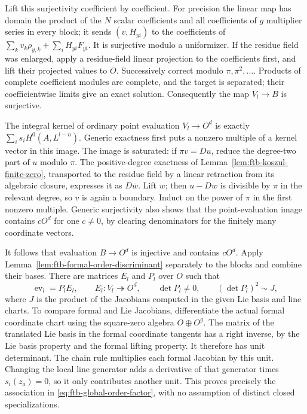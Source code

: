 Lift this surjectivity coefficient by coefficient.
For precision the linear map has domain the product of the \(N\)
scalar coefficients and all coefficients of \(g\) multiplier series
in every block; it sends \((v,H_{yi})\) to the coefficients of
\(\sum_kv_k\rho_{y,k}+\sum_iH_{yi}F_{yi}\).
It is surjective modulo a uniformizer.
If the residue field was enlarged, apply a residue-field linear
projection to the coefficients first, and lift their projected
values to \(O\).
Successively correct modulo \(\pi,\pi^2,\ldots\).
Products of complete coefficient modules are complete, and the
target is separated; their coefficientwise limits give an exact
solution.  Consequently the map \(V_l\to B\) is surjective.

The integral kernel of ordinary point evaluation \(V_l\to O^d\)
is exactly \(\sum_i s_i H^0(A,L^{l-n})\).
Generic exactness first puts a nonzero multiple of a kernel vector
in this image.  The image is saturated: if \(\pi v=Du\), reduce
the degree-two part of \(u\) modulo \(\pi\).
The positive-degree exactness of
Lemma~\ref{lem:ftb-koszul-finite-zero}, transported to the residue
field by a linear retraction from its algebraic closure, expresses it as
\(D\bar w\).  Lift \(w\); then \(u-Dw\) is divisible by \(\pi\)
in the relevant degree, so \(v\) is again a boundary.
Induct on the power of \(\pi\) in the first nonzero multiple.
Generic surjectivity also shows that the point-evaluation image
contains \(cO^d\) for one \(c\ne0\), by clearing denominators for
the finitely many coordinate vectors.

It follows that evaluation \(B\to O^d\) is injective and contains
\(cO^d\).  Apply
Lemma~\ref{lem:ftb-formal-order-discriminant} separately to the
blocks and combine their bases.
There are matrices \(E_l\) and \(P_l\) over \(O\) such that
\[
 \operatorname{ev}_l=P_lE_l,\qquad
 E_l:V_l\twoheadrightarrow O^d,\qquad \det P_l\ne0,\qquad
       (\det P_l)^2\sim J,                          \tag{K17}\label{eq:ftb-global-order-factor}
\]
where \(J\) is the product of the Jacobians computed in the given
Lie basis and line charts.
To compare formal and Lie Jacobians, differentiate the actual
formal coordinate chart using the square-zero algebra
\(O\oplus O^g\).
The matrix of the translated Lie basis in the formal coordinate
tangents has a right inverse, by the Lie basis property and the
formal lifting property.  It therefore has unit determinant.
The chain rule multiplies each formal Jacobian by this unit.
Changing the local line generator adds a derivative of that generator
times \(s_i(z_a)=0\), so it only contributes another unit.
This proves precisely the association in
\eqref{eq:ftb-global-order-factor}, with no assumption of distinct
closed specializations.

